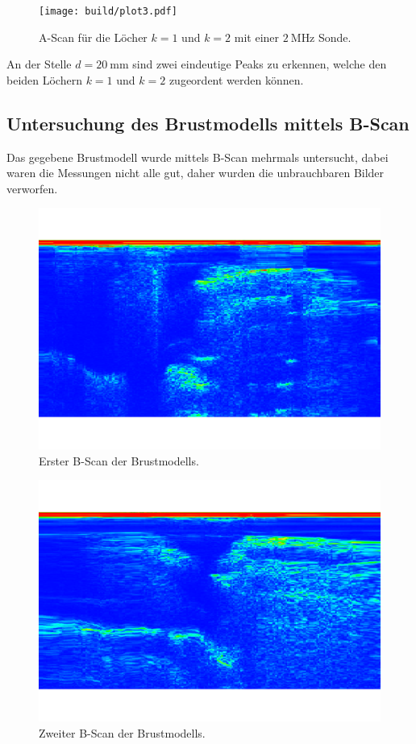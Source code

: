 \begin{figure}[H]
	\texttt{[image: build/plot3.pdf]}
	\captionsetup{width=0.765\linewidth}
	\caption{A-Scan für die Löcher $k = 1$ und $k = 2$ mit einer $\SI{2}{\mega\hertz}$ Sonde.}
	\label{fig:plot3}
\end{figure}
An der Stelle $d = \SI{20}{\milli\meter}$ sind zwei eindeutige Peaks zu erkennen, welche den beiden Löchern $k = 1$ und $k = 2$
zugeordent werden können.

\subsection{Untersuchung des Brustmodells mittels B-Scan}
\label{sec:Untersuchung des Brustmodells mittels B-Scan}

Das gegebene Brustmodell wurde mittels B-Scan mehrmals untersucht, dabei waren die Messungen nicht alle gut, daher wurden 
die unbrauchbaren Bilder verworfen.

\begin{figure}[H]
    \centering
	\includegraphics[width=0.8\linewidth]{content/grafik/Tumor_2.pdf}
    \captionsetup{width=0.765\linewidth}
	\caption{Erster B-Scan der Brustmodells.}
	\label{fig:b1}
\end{figure}

\begin{figure}[H]
    \centering
	\includegraphics[width=0.8\linewidth]{content/grafik/Super_Tumor.pdf}
    \captionsetup{width=0.765\linewidth}
	\caption{Zweiter B-Scan der Brustmodells.}
	\label{fig:b2}
\end{figure}

